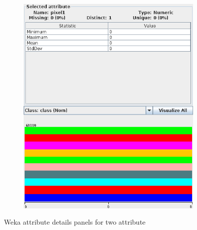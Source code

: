 \documentclass[10pt]{article}
\begin{document}
\begin{figure}
\begin{subfigure}[t]{.5\textwidth}
          \includegraphics[width=0.9\linewidth]{weka-useless-feature.png}
          \label{fig:wekaUselessFeature}
        \end{subfigure}

        \caption{Weka attribute details panels for two attribute}
        \label{fig:wekaFeature}
      \end{figure}
\end{document}
